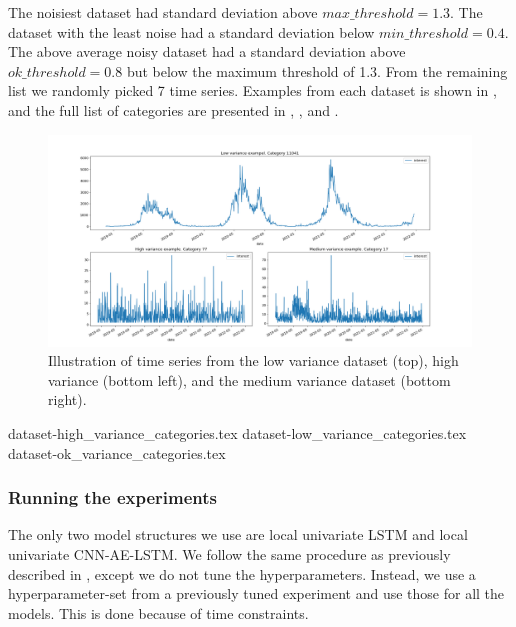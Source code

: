 The noisiest dataset had standard deviation above $max\_threshold = 1.3$.
The dataset with the least noise had a standard deviation below $min\_threshold = 0.4$.
The above average noisy dataset had a standard deviation above $ok\_threshold = 0.8$
but below the maximum threshold of 1.3.
From the remaining list we randomly picked 7 time series.
Examples from each dataset is shown in ,
and the full list of categories are presented in
,
,
and .

\begin{figure}[h!]
  \centering
  \includegraphics[width=\textwidth]{./figs/code_generated/time-series-variance-examples.png}
  \hfill
  \caption{Illustration of time series from the low variance dataset (top), high variance (bottom left), and the medium variance dataset (bottom right).}
  \label{fig:time-series-variance-examples}
\end{figure}

{dataset-high_variance_categories.tex}
{dataset-low_variance_categories.tex}
{dataset-ok_variance_categories.tex}

\subsubsection{Running the experiments}
The only two model structures we use are local univariate LSTM
and local univariate CNN-AE-LSTM.
We follow the same procedure as previously described in ,
except we do not tune the hyperparameters. Instead, we
use a hyperparameter-set from a previously tuned experiment and use those for all the models.
This is done because of time constraints.

